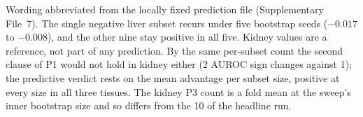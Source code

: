 \documentclass[unnumsec,webpdf,contemporary,large,numbered]{oup-authoring-template}
\begin{document}
\begin{table}[!t]
\begin{tablenotes}%
\item Wording abbreviated from the locally fixed prediction file (Supplementary File~7). The single negative liver subset recurs under five bootstrap seeds ($-0.017$ to $-0.008$), and the other nine stay positive in all five. Kidney values are a reference, not part of any prediction. By the same per-subset count the second clause of P1 would not hold in kidney either (2 AUROC sign changes against 1); the predictive verdict rests on the mean advantage per subset size, positive at every size in all three tissues. The kidney P3 count is a fold mean at the sweep's inner bootstrap size and so differs from the 10 of the headline run.
\end{tablenotes}
\end{table}
\end{document}

